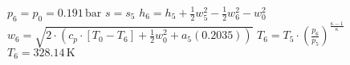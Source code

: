 \( p_6 = p_0 = 0.191 \, \text{bar} \)  
\( s = s_5 \)  
\( h_6 = h_5 + \frac{1}{2} w_5^2 - \frac{1}{2} w_6^2 - w_0^2 \)  
\( w_6 = \sqrt{2 \cdot \left( c_p \cdot [T_0 - T_6] + \frac{1}{2} w_0^2 + a_5 (0.2035) \right)} \)  
\( T_6 = T_5 \cdot \left( \frac{p_6}{p_5} \right)^{\frac{\kappa - 1}{\kappa}} \)  
\( T_6 = 328.14 \, \text{K} \)